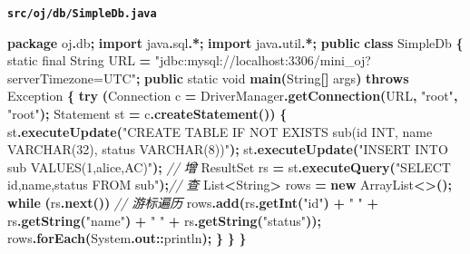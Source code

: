 \documentclass[
  11pt,
]{ctexart}
\newenvironment{Shaded}{\begin{snugshade}}{\end{snugshade}}
\newcommand{\BuiltInTok}[1]{#1}
\newcommand{\CommentTok}[1]{\textcolor[rgb]{0.56,0.35,0.01}{\textit{#1}}}
\newcommand{\ControlFlowTok}[1]{\textcolor[rgb]{0.13,0.29,0.53}{\textbf{#1}}}
\newcommand{\DataTypeTok}[1]{\textcolor[rgb]{0.13,0.29,0.53}{#1}}
\newcommand{\FunctionTok}[1]{\textcolor[rgb]{0.13,0.29,0.53}{\textbf{#1}}}
\newcommand{\ImportTok}[1]{#1}
\newcommand{\KeywordTok}[1]{\textcolor[rgb]{0.13,0.29,0.53}{\textbf{#1}}}
\newcommand{\NormalTok}[1]{#1}
\newcommand{\OperatorTok}[1]{\textcolor[rgb]{0.81,0.36,0.00}{\textbf{#1}}}
\newcommand{\StringTok}[1]{\textcolor[rgb]{0.31,0.60,0.02}{#1}}
\begin{document}
\textbf{\texttt{src/oj/db/SimpleDb.java}}

\begin{Shaded}
\begin{Highlighting}[]
\KeywordTok{package}\ImportTok{ oj}\OperatorTok{.}\ImportTok{db}\OperatorTok{;}
\KeywordTok{import} \ImportTok{java}\OperatorTok{.}\ImportTok{sql}\OperatorTok{.*;}
\KeywordTok{import} \ImportTok{java}\OperatorTok{.}\ImportTok{util}\OperatorTok{.*;}
\KeywordTok{public} \KeywordTok{class}\NormalTok{ SimpleDb }\OperatorTok{\{}
    \DataTypeTok{static} \DataTypeTok{final} \BuiltInTok{String} \BuiltInTok{URL} \OperatorTok{=} \StringTok{"jdbc:mysql://localhost:3306/mini\_oj?serverTimezone=UTC"}\OperatorTok{;}
    \KeywordTok{public} \DataTypeTok{static} \DataTypeTok{void} \FunctionTok{main}\OperatorTok{(}\BuiltInTok{String}\OperatorTok{[]}\NormalTok{ args}\OperatorTok{)} \KeywordTok{throws} \BuiltInTok{Exception} \OperatorTok{\{}
        \ControlFlowTok{try} \OperatorTok{(}\BuiltInTok{Connection}\NormalTok{ c }\OperatorTok{=} \BuiltInTok{DriverManager}\OperatorTok{.}\FunctionTok{getConnection}\OperatorTok{(}\BuiltInTok{URL}\OperatorTok{,} \StringTok{"root"}\OperatorTok{,} \StringTok{"root"}\OperatorTok{);}
             \BuiltInTok{Statement}\NormalTok{ st }\OperatorTok{=}\NormalTok{ c}\OperatorTok{.}\FunctionTok{createStatement}\OperatorTok{())} \OperatorTok{\{}
\NormalTok{            st}\OperatorTok{.}\FunctionTok{executeUpdate}\OperatorTok{(}\StringTok{"CREATE TABLE IF NOT EXISTS sub(id INT, name VARCHAR(32), status VARCHAR(8))"}\OperatorTok{);}
\NormalTok{            st}\OperatorTok{.}\FunctionTok{executeUpdate}\OperatorTok{(}\StringTok{"INSERT INTO sub VALUES(1,\textquotesingle{}alice\textquotesingle{},\textquotesingle{}AC\textquotesingle{})"}\OperatorTok{);}      \CommentTok{// 增}
            \BuiltInTok{ResultSet}\NormalTok{ rs }\OperatorTok{=}\NormalTok{ st}\OperatorTok{.}\FunctionTok{executeQuery}\OperatorTok{(}\StringTok{"SELECT id,name,status FROM sub"}\OperatorTok{);}\CommentTok{// 查}
            \BuiltInTok{List}\OperatorTok{\textless{}}\BuiltInTok{String}\OperatorTok{\textgreater{}}\NormalTok{ rows }\OperatorTok{=} \KeywordTok{new} \BuiltInTok{ArrayList}\OperatorTok{\textless{}\textgreater{}();}
            \ControlFlowTok{while} \OperatorTok{(}\NormalTok{rs}\OperatorTok{.}\FunctionTok{next}\OperatorTok{())}                                                \CommentTok{// 游标遍历}
\NormalTok{                rows}\OperatorTok{.}\FunctionTok{add}\OperatorTok{(}\NormalTok{rs}\OperatorTok{.}\FunctionTok{getInt}\OperatorTok{(}\StringTok{"id"}\OperatorTok{)} \OperatorTok{+} \StringTok{" "} \OperatorTok{+}\NormalTok{ rs}\OperatorTok{.}\FunctionTok{getString}\OperatorTok{(}\StringTok{"name"}\OperatorTok{)} \OperatorTok{+} \StringTok{" "} \OperatorTok{+}\NormalTok{ rs}\OperatorTok{.}\FunctionTok{getString}\OperatorTok{(}\StringTok{"status"}\OperatorTok{));}
\NormalTok{            rows}\OperatorTok{.}\FunctionTok{forEach}\OperatorTok{(}\BuiltInTok{System}\OperatorTok{.}\FunctionTok{out}\OperatorTok{::}\NormalTok{println}\OperatorTok{);}
        \OperatorTok{\}}
    \OperatorTok{\}}
\OperatorTok{\}}
\end{Highlighting}
\end{Shaded}
\end{document}
